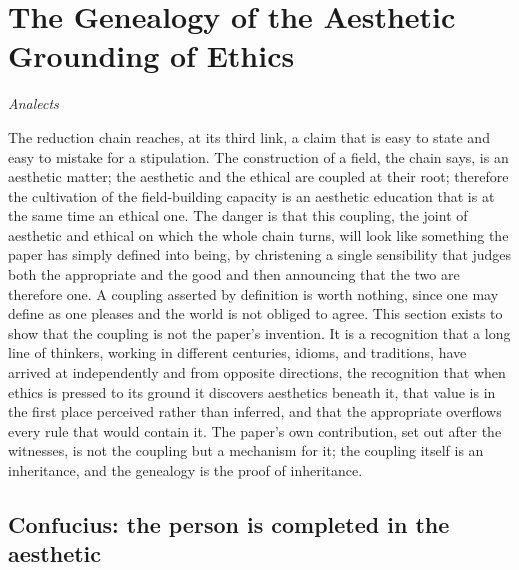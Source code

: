 \section{The Genealogy of the Aesthetic Grounding of Ethics}
\label{p22:sec:genealogy}

\epigraph{}{\textit{Analects}}

\noindent
The reduction chain reaches, at its third link, a claim that is easy to state and easy to mistake for a stipulation. The construction of a field, the chain says, is an aesthetic matter; the aesthetic and the ethical are coupled at their root; therefore the cultivation of the field-building capacity is an aesthetic education that is at the same time an ethical one. The danger is that this coupling, the joint of aesthetic and ethical on which the whole chain turns, will look like something the paper has simply defined into being, by christening a single sensibility that judges both the appropriate and the good and then announcing that the two are therefore one. A coupling asserted by definition is worth nothing, since one may define as one pleases and the world is not obliged to agree. This section exists to show that the coupling is not the paper's invention. It is a recognition that a long line of thinkers, working in different centuries, idioms, and traditions, have arrived at independently and from opposite directions, the recognition that when ethics is pressed to its ground it discovers aesthetics beneath it, that value is in the first place perceived rather than inferred, and that the appropriate overflows every rule that would contain it. The paper's own contribution, set out after the witnesses, is not the coupling but a mechanism for it; the coupling itself is an inheritance, and the genealogy is the proof of inheritance.

\subsection{Confucius: the person is completed in the aesthetic}
\label{p22:sub:gen-confucius}

